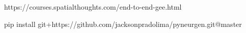 https://courses.spatialthoughts.com/end-to-end-gee.html


pip install git+https://github.com/jacksonpradolima/pyneurgen.git@master